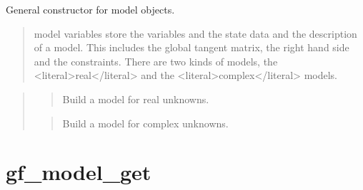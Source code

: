 \documentclass[a4paper,11pt,english]{sphinxmanual}
\begin{document}
\sphinxAtStartPar
{}

\sphinxAtStartPar
General constructor for model objects.
\begin{quote}

\sphinxAtStartPar
model variables store the variables and the state data and the
description of a model. This includes the global tangent matrix, the right
hand side and the constraints. There are two kinds of models, the \textless{}literal\textgreater{}real\textless{}/literal\textgreater{}
and the \textless{}literal\textgreater{}complex\textless{}/literal\textgreater{} models.
\end{quote}

\sphinxAtStartPar
{}
\begin{quote}

\sphinxAtStartPar
{}
\begin{quote}

\sphinxAtStartPar
Build a model for real unknowns.
\end{quote}

\sphinxAtStartPar
{}
\begin{quote}

\sphinxAtStartPar
Build a model for complex unknowns.
\end{quote}
\end{quote}


\section{gf\_model\_get}
\label{\detokenize{scilab/cmdref_gf_model_get:gf-model-get}}\label{\detokenize{scilab/cmdref_gf_model_get::doc}}
\sphinxAtStartPar
{}
\end{document}
